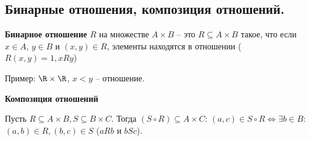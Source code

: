 \subsection{Бинарные отношения, композиция отношений.}

\textbf{Бинарное отношение} $R$ на множестве $A \times B$ -- это $R \subseteq A \times B$ такое, что если $x \in A$, $y \in B$ и $(x, y) \in R$, элементы находятся в отношении ($R(x, y) = 1, xRy$)

Пример: $\R \times \R$, $x < y$ -- отношение.

\textbf{Композиция отношений}

Пусть $R \subseteq A \times B, S \subseteq B \times C$. Тогда $(S \circ R) \subseteq A \times C$: $(a, c) \in S \circ R \Leftrightarrow \exists b \in B:$ $(a, b) \in R, (b, c) \in S$ ($aRb$ и $bSc$).
